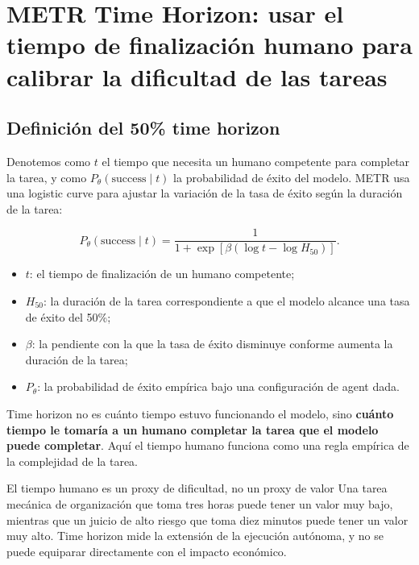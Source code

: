 \section{METR Time Horizon: usar el tiempo de finalización humano para calibrar la dificultad de las tareas}

\subsection{Definición del 50\% time horizon}


Denotemos como $t$ el tiempo que necesita un humano competente para completar la tarea, y como $P_\theta(\text{success}\mid t)$ la probabilidad de éxito del modelo. METR usa una logistic curve para ajustar la variación de la tasa de éxito según la duración de la tarea:

$$
P_\theta(\text{success}\mid t)=
\frac{1}{1+\exp\left[\beta\left(\log t-\log H_{50}\right)\right]}.
$$

\begin{itemize}
    \item $t$: el tiempo de finalización de un humano competente;
    \item $H_{50}$: la duración de la tarea correspondiente a que el modelo alcance una tasa de éxito del 50\%;
    \item $\beta$: la pendiente con la que la tasa de éxito disminuye conforme aumenta la duración de la tarea;
    \item $P_\theta$: la probabilidad de éxito empírica bajo una configuración de agent dada.
\end{itemize}

Time horizon no es cuánto tiempo estuvo funcionando el modelo, sino \textbf{cuánto tiempo le tomaría a un humano completar la tarea que el modelo puede completar}. Aquí el tiempo humano funciona como una regla empírica de la complejidad de la tarea.

\begin{importantbox}{El tiempo humano es un proxy de dificultad, no un proxy de valor}
Una tarea mecánica de organización que toma tres horas puede tener un valor muy bajo, mientras que un juicio de alto riesgo que toma diez minutos puede tener un valor muy alto. Time horizon mide la extensión de la ejecución autónoma, y no se puede equiparar directamente con el impacto económico.
\end{importantbox}

